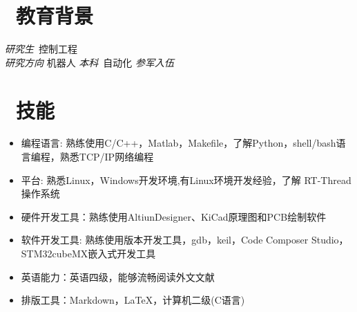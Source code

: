 \documentclass{resume}
\begin{document}
\section{\faGraduationCap\  教育背景}
\textit{研究生}\ \quad \quad 控制工程  \\ \textit{研究方向} \quad 机器人
\textit{本科}\  \quad \quad\quad 自动化
\textit{参军入伍}\








%
%
%
%




\section{\faCogs\  技能}
\begin{itemize}[parsep=0.5ex]
  \item 编程语言: 熟练使用C/C++，Matlab，Makefile，了解Python，shell/bash语言编程，熟悉TCP/IP网络编程
  \item 平台: 熟悉Linux，Windows开发环境,有Linux环境开发经验，了解 RT-Thread操作系统
   \item 硬件开发工具：熟练使用AltiunDesigner、KiCad原理图和PCB绘制软件
  \item 软件开发工具: 熟练使用\faGit 版本开发工具，gdb，keil，Code Composer Studio，STM32cubeMX嵌入式开发工具
  \item 英语能力：英语四级，能够流畅阅读外文文献
  \item 排版工具：Markdown，\LaTeX，计算机二级(C语言)
\end{itemize}







%
%
%
%
\end{document}

